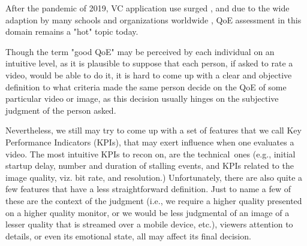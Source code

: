 After the pandemic of 2019, VC application use surged \cite{chang2021can} \cite{feldmann2020lockdown}, and due to the wide adaption by many schools and organizations worldwide \cite{choi2022zoom} \cite{espin2021impact} \cite{nistico2020comparative}, QoE assessment in this domain remains a "hot" topic today.






Though the term "good QoE" may be perceived by each individual on an intuitive level, as it is plausible to suppose that each person, if asked to rate a video, would be able to do it, it is hard to come up with a clear and objective definition to what criteria made the same person decide on the QoE of some particular video or image, as this decision usually hinges on the subjective judgment of the person asked. 

Nevertheless, we still may try to come up with a set of features that we call Key Performance Indicators (KPIs), that may exert influence when one evaluates a video. The most intuitive KPIs to recon on, are the technical ones (e.g., initial startup delay, number and duration of stalling events, and KPIs related to the image quality, viz. bit rate, and resolution.) Unfortunately, there are also quite a few features that have a less straightforward definition. Just to name a few of these are the context of the judgment (i.e., we require a higher quality presented on a higher quality monitor, or we would be less judgmental of an image of a lesser quality that is streamed over a mobile device, etc.), viewers attention to details, or even its emotional state, all may affect its final decision. 


